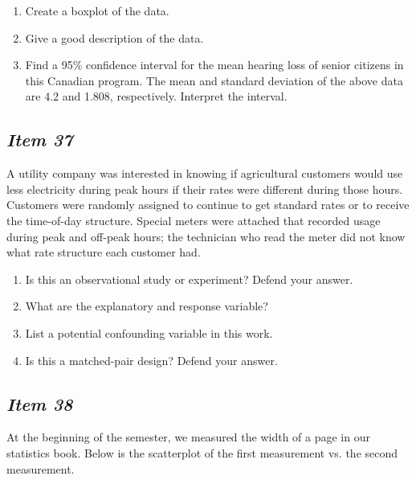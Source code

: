 \begin{enumerate}[leftmargin=1cm, itemsep=.2em]
\item Create a boxplot of the data.
\item Give a good description of the data.
\item Find a 95\% confidence interval for the mean hearing loss of senior citizens in this Canadian program.   The mean and standard deviation of the above data are 4.2 and 1.808, respectively. Interpret the interval.
\end{enumerate}

\subsection{\textbf{\textit{Item 37}}}
A utility company was interested in knowing if agricultural customers would use less electricity during peak hours if their rates were different during those hours.  Customers were randomly assigned to continue to get standard rates or to receive the time-of-day structure.  Special meters were attached that recorded usage during peak and off-peak hours; the technician who read the meter did not know what rate structure each customer had.
\begin{enumerate}[leftmargin=1cm, itemsep=.2em]
\item Is this an observational study or experiment?  Defend your answer.
\item What are the explanatory and response variable?
\item List a potential confounding variable in this work.
\item Is this a matched-pair design?  Defend your answer.
\end{enumerate}


\subsection{\textbf{\textit{Item 38}}}
At the beginning of the semester, we measured the width of a page in our statistics book.  Below is the scatterplot of the first measurement vs. the second measurement. 


